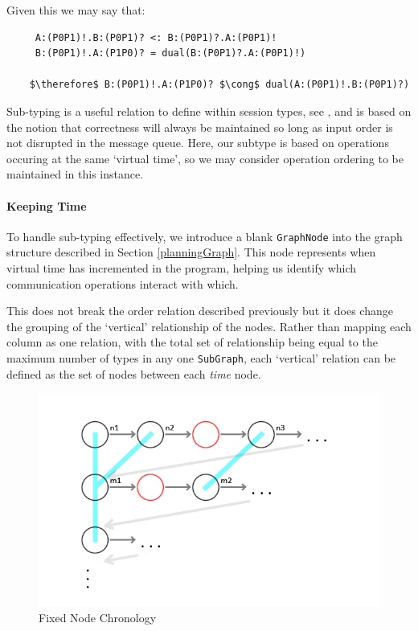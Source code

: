 \documentclass[11pt, abstracton, twoside, titlepage=true]{scrartcl}
\def\therefore{
	\leavevmode
	\lower0.4ex\hbox{$\cdot$}
	\kern-.5em\raise0.7ex\hbox{$\cdot$}
	\kern-0.55em\lower0.4ex\hbox{$\cdot$}
	\thinspace
}
\begin{document}
Given this we may say that:
\\
\begin{lstlisting}
     A:(P0P1)!.B:(P0P1)? <: B:(P0P1)?.A:(P0P1)!
     B:(P0P1)!.A:(P1P0)? = dual(B:(P0P1)?.A:(P0P1)!)

    $\therefore$ B:(P0P1)!.A:(P1P0)? $\cong$ dual(A:(P0P1)!.B:(P0P1)?)
\end{lstlisting}

Sub-typing is a useful relation to define within session types, see 
\cite{HYC08, MY15, MYH09}, and is based on the notion that correctness will 
always be maintained so long as input order is not disrupted in the message 
queue. Here, our subtype is based on operations occuring at the same `virtual 
time', so we may consider operation ordering to be maintained in this instance. 


\paragraph{Keeping Time}
To handle sub-typing effectively, we introduce a blank \texttt{GraphNode} into the 
graph structure described in Section \ref{planningGraph}. This node represents when 
virtual time has incremented in the program, helping us identify which communication 
operations interact with which.

This does not break the order relation
described previously but it does change the grouping of the `vertical' 
relationship of the nodes. Rather than mapping each column as one relation, with
the total set of relationship being equal to the maximum number of types in
any one \texttt{SubGraph}, each `vertical' relation can be defined as the
set of nodes between each \emph{time} node.

\begin{figure}[h!]
	\centering
	\includegraphics[width=\textwidth]{images/GraphTwo.jpg}
	\caption{Fixed Node Chronology} \label{graphTwo}
\end{figure}
\end{document}
